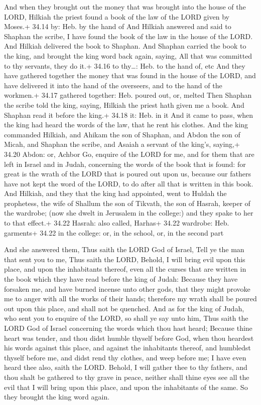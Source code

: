  And when they brought out the money that was brought
into the house of the LORD, Hilkiah the priest found a book of the law
of the LORD given by Moses.+ 34.14 by: Heb. by the hand of 
And Hilkiah answered and said to Shaphan the scribe, I have found the
book of the law in the house of the LORD. And Hilkiah delivered the book
to Shaphan.  And Shaphan carried the book to the king, and
brought the king word back again, saying, All that was committed to thy
servants, they do it.+ 34.16 to thy\ldots: Heb. to the hand of, etc
 And they have gathered together the money that was found
in the house of the LORD, and have delivered it into the hand of the
overseers, and to the hand of the workmen.+ 34.17 gathered together:
Heb. poured out, or, melted  Then Shaphan the scribe told
the king, saying, Hilkiah the priest hath given me a book. And Shaphan
read it before the king.+ 34.18 it: Heb. in it  And it came
to pass, when the king had heard the words of the law, that he rent his
clothes.  And the king commanded Hilkiah, and Ahikam the
son of Shaphan, and Abdon the son of Micah, and Shaphan the scribe, and
Asaiah a servant of the king's, saying,+ 34.20 Abdon: or, Achbor
 Go, enquire of the LORD for me, and for them that are left
in Israel and in Judah, concerning the words of the book that is found:
for great is the wrath of the LORD that is poured out upon us, because
our fathers have not kept the word of the LORD, to do after all that is
written in this book.  And Hilkiah, and they that the king
had appointed, went to Huldah the prophetess, the wife of Shallum the
son of Tikvath, the son of Hasrah, keeper of the wardrobe; (now she
dwelt in Jerusalem in the college:) and they spake to her to that
effect.+ 34.22 Hasrah: also called, Harhas+ 34.22 wardrobe: Heb.
garments+ 34.22 in the college: or, in the school, or, in the second
part

 And she answered them, Thus saith the LORD God of
Israel, Tell ye the man that sent you to me,  Thus saith
the LORD, Behold, I will bring evil upon this place, and upon the
inhabitants thereof, even all the curses that are written in the book
which they have read before the king of Judah:  Because
they have forsaken me, and have burned incense unto other gods, that
they might provoke me to anger with all the works of their hands;
therefore my wrath shall be poured out upon this place, and shall not be
quenched.  And as for the king of Judah, who sent you to
enquire of the LORD, so shall ye say unto him, Thus saith the LORD God
of Israel concerning the words which thou hast heard; 
Because thine heart was tender, and thou didst humble thyself before
God, when thou heardest his words against this place, and against the
inhabitants thereof, and humbledst thyself before me, and didst rend thy
clothes, and weep before me; I have even heard thee also, saith the
LORD.  Behold, I will gather thee to thy fathers, and thou
shalt be gathered to thy grave in peace, neither shall thine eyes see
all the evil that I will bring upon this place, and upon the inhabitants
of the same. So they brought the king word again.

